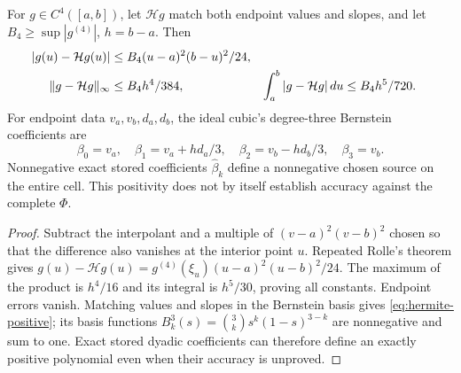 \begin{proposition}
\label{prop:hermite-source}
For $g\in C^4([a,b])$, let $\mathcal Hg$ match both endpoint values
and slopes, and let $B_4\ge\sup|g^{(4)}|$, $h=b-a$. Then
\begin{align}
 |g(u)-\mathcal Hg(u)|&\le B_4(u-a)^2(b-u)^2/24,\notag\\
 \|g-\mathcal Hg\|_\infty&\le B_4h^4/384,
 &\int_a^b|g-\mathcal Hg|\,du&\le B_4h^5/720.
 \label{eq:hermite-remainder}
\end{align}
For endpoint data $v_a,v_b,d_a,d_b$, the ideal cubic's degree-three
Bernstein coefficients are
\begin{equation}
 \beta_0=v_a,\quad\beta_1=v_a+hd_a/3,\quad
 \beta_2=v_b-hd_b/3,\quad\beta_3=v_b.
 \label{eq:hermite-positive}
\end{equation}
Nonnegative exact stored coefficients $\widehat\beta_k$ define a
nonnegative chosen source on the entire cell. This positivity does not
by itself establish accuracy against the complete $\Phi$.
\end{proposition}
\begin{proof}
Subtract the interpolant and a multiple of $(v-a)^2(v-b)^2$ chosen
so that the difference also vanishes at the interior point $u$.
Repeated Rolle's theorem gives
$g(u)-\mathcal Hg(u)=g^{(4)}(\xi_u)(u-a)^2(u-b)^2/24$.
The maximum of the product is $h^4/16$ and its integral is $h^5/30$,
proving all constants. Endpoint errors vanish. Matching values and
slopes in the Bernstein basis gives \eqref{eq:hermite-positive}; its
basis functions $B_k^3(s)=\binom{3}{k} s^k(1-s)^{3-k}$ are nonnegative
and sum to one. Exact stored dyadic coefficients can therefore define
an exactly positive polynomial even when their accuracy is unproved.
\end{proof}

